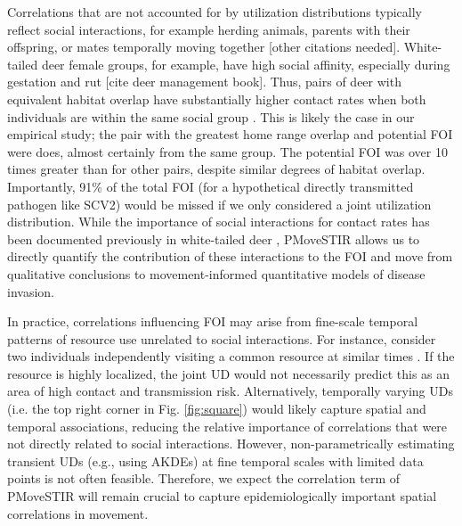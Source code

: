 \documentclass[letterpaper]{article}
\begin{document}
Correlations that are not accounted for by utilization distributions typically reflect social interactions, for example %
herding animals, parents with their offspring, or mates temporally moving together \citep{Yang2021} [other citations needed]. 
White-tailed deer female groups, for example, have high social affinity, especially during gestation and rut
\citep{Koen2017} [cite deer management book]. Thus, pairs of deer with equivalent habitat overlap have substantially higher contact rates when both individuals are within the same social group \citep{Schauber2007a,Kjaer2008,Schauber2015a,Grear2010}. This is likely the case in our empirical study; the pair with the greatest home range overlap and potential FOI were does, almost certainly from the same group. The potential FOI was over 10 times greater than for other pairs, despite similar degrees of habitat overlap. Importantly, 91\% of the total FOI (for a hypothetical directly transmitted pathogen like SCV2) would be missed if we only considered a joint utilization distribution. While the importance of social interactions for contact rates has been documented previously in white-tailed deer \citep{Grear2010,Schauber2015a}, PMoveSTIR allows us to directly quantify the contribution of these interactions to the FOI and move from qualitative conclusions to movement-informed quantitative models of disease invasion.

In practice, correlations influencing FOI may arise from fine-scale temporal patterns of resource use unrelated to social interactions. For instance, consider two individuals independently visiting a common resource at similar times \citep[e.g., a watering hole][]{VanderWaal2017}. If the resource is highly localized, the joint UD would not necessarily predict this as an area of high contact and transmission risk. %
Alternatively, temporally varying UDs (i.e. the top right corner in Fig. \ref{fig:square}) would likely capture spatial and temporal associations, reducing the relative importance of correlations that were not directly related to social interactions. However, non-parametrically estimating transient UDs (e.g., using AKDEs) at fine temporal scales with limited data points is not often feasible. Therefore, we expect the correlation term of PMoveSTIR will remain crucial to capture epidemiologically important spatial correlations in movement. 
\end{document}
